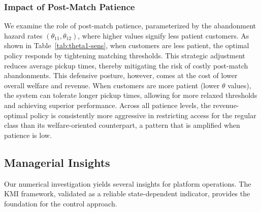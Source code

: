 

\subsubsection{Impact of Post-Match Patience}
We examine the role of post-match patience, parameterized by the abandonment hazard rates $(\theta_{11}, \theta_{12})$, where higher values signify less patient customers.
As shown in Table~\ref{tab:theta1-sens}, when customers are less patient, the optimal policy responds by tightening matching thresholds.
This strategic adjustment reduces average pickup times, thereby mitigating the risk of costly post-match abandonments.
This defensive posture, however, comes at the cost of lower overall welfare and revenue.
When customers are more patient (lower $\theta$ values), the system can tolerate longer pickup times, allowing for more relaxed thresholds and achieving superior performance.
Across all patience levels, the revenue-optimal policy is consistently more aggressive in restricting access for the regular class than its welfare-oriented counterpart, a pattern that is amplified when patience is low.



\subsection{Managerial Insights}
\label{sec:insights}
Our numerical investigation yields several insights for platform operations.
The KMI framework, validated as a reliable state-dependent indicator, provides the foundation for the control approach.

